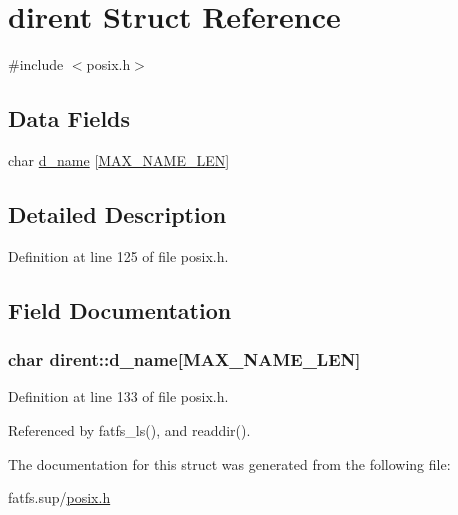 \hypertarget{structdirent}{}\section{dirent Struct Reference}
\label{structdirent}


{\ttfamily \#include $<$posix.\+h$>$}

\subsection*{Data Fields}
\begin{DoxyCompactItemize}
\item 
char \hyperlink{structdirent_ae61380f3ccbc6c32e8650d7bce76197b}{d\+\_\+name} \mbox{[}\hyperlink{posix_8h_afd709f201d7643c3909621f620ea648a}{M\+A\+X\+\_\+\+N\+A\+M\+E\+\_\+\+L\+EN}\mbox{]}
\end{DoxyCompactItemize}


\subsection{Detailed Description}


Definition at line 125 of file posix.\+h.



\subsection{Field Documentation}
\subsubsection[{\texorpdfstring{d\+\_\+name}{d_name}}]{\setlength{\rightskip}{0pt plus 5cm}char dirent\+::d\+\_\+name\mbox{[}{\bf M\+A\+X\+\_\+\+N\+A\+M\+E\+\_\+\+L\+EN}\mbox{]}}\hypertarget{structdirent_ae61380f3ccbc6c32e8650d7bce76197b}{}\label{structdirent_ae61380f3ccbc6c32e8650d7bce76197b}


Definition at line 133 of file posix.\+h.



Referenced by fatfs\+\_\+ls(), and readdir().



The documentation for this struct was generated from the following file\+:\begin{DoxyCompactItemize}
\item 
fatfs.\+sup/\hyperlink{posix_8h}{posix.\+h}\end{DoxyCompactItemize}
